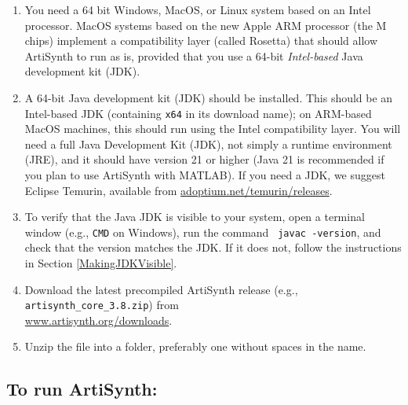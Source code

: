 \documentclass{article}
\begin{document}
\begin{enumerate}

\item You need a 64 bit Windows, MacOS, or Linux system based on an Intel
processor. MacOS systems based on the new Apple ARM processor (the M
chips) implement a compatibility layer (called Rosetta) that should allow
ArtiSynth to run as is, provided that you use a 64-bit {\it Intel-based} Java
development kit (JDK).

\item A 64-bit Java development kit (JDK) should be installed. This should be
an Intel-based JDK (containing {\tt x64} in its download name); on ARM-based
MacOS machines, this should run using the Intel compatibility layer.
You will need a full Java Development Kit (JDK), not simply a runtime
environment (JRE), and it should have version 21 or higher (Java 21 is
recommended if you plan to use ArtiSynth with MATLAB). If you need
a JDK, we suggest Eclipse Temurin, available from
\href{https://adoptium.net/temurin/releases/}%
{adoptium.net/temurin/releases}.
 
\item To verify that the Java JDK is visible to your system, open a
terminal window (e.g., {\tt CMD} on Windows), run the command {\tt
javac -version}, and check that the version matches the JDK.  If it
does not, follow the instructions in Section
\ref{MakingJDKVisible}.

\item Download the latest precompiled ArtiSynth release 
(e.g., {\tt artisynth\_core\_3.8.zip}) from
\iflatexml\else\\\fi %
\href{https://www.artisynth.org/downloads}{www.artisynth.org/downloads}.
 
\item Unzip the file into a folder, preferably one without spaces in the
name.

\end{enumerate}
 
\subsection{To run ArtiSynth:}
\end{document}
